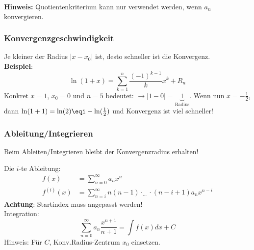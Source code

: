 \noindent\textbf{Hinweis:} Quotientenkriterium kann nur verwendet werden, wenn $a_n$ konvergieren.

\subsubsection{Konvergenzgeschwindigkeit}
Je kleiner der Radius $\left|x - x_0\right|$ ist, desto schneller ist die Konvergenz. \\
\noindent\textbf{Beispiel}:
\[
\ln(1+x) = \sum_{k=1}^{n}\frac{(-1)^{k-1}}{k} x^k + R_n
\]
\noindent Konkret $x=1$, $x_0 = 0$ und $n=5$ bedeutet: $\to \left|1 - 0\right| = \underbrace{1}_{\text{Radius}}$. Wenn nun $x = -\frac{1}{2}$, dann $\ln(1 + 1) = \ln(2) \eqi -\ln(\frac{1}{2})$ und Konvergenz ist viel schneller!


\subsubsection{Ableitung/Integrieren}
Beim Ableiten/Integrieren bleibt der Konvergenzradius erhalten! 

Die $i$-te Ableitung: 
\begin{align*}
	 f(x)  &= \sum_{n=0}^{\infty}a_nx^n\\
	f^{(i)}(x) &= \sum_{n=i}^{\infty}n(n-1)\cdot_{\dots}\cdot(n-i+1)a_nx^{n-i}
\end{align*}
\noindent\textbf{Achtung}: Startindex muss angepasst werden! \\

Integration: \[\sum_{n=0}^{\infty}a_n\frac{x^{n+1}}{n+1}=\int f(x)dx+C\]
Hinweis: Für $C$, Konv.Radius-Zentrum $x_0$ einsetzen.
